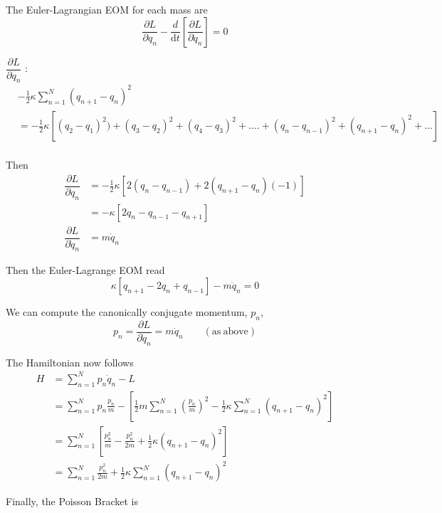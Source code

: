\documentclass{article}
\begin{document}
\noindent The Euler-Lagrangian EOM for each mass are
\begin{equation}
    \dfrac{ \partial L }{ \partial q_n} -  \dfrac{d}{ \mathrm{d} t} \left[\dfrac{ \partial L }{ \partial \dot {q}_n } \right] = 0
\end{equation}

\noindent $\dfrac{ \partial L }{ \partial q_n}$ :
\begin{align*}
    & -\tfrac{1}{2} \kappa \sum_{n=1}^N (q_{n+1} - q_n)^2 \\
    &= -\tfrac{1}{2} \kappa \left[(q_{2} - q_1)^2) + (q_{3} - q_2)^2 + (q_{4} - q_3)^2 +....+ (q_{n} - q_{n-1})^2 + (q_{n+1} - q_n)^2 + \dots \right] \\
\end{align*}

\noindent Then
\begin{align*}
    \dfrac{ \partial L }{ \partial q_n} &= -\tfrac{1}{2} \kappa \left[ 2 (q_{n} - q_{n-1}) + 2 (q_{n+1} - q_n)(-1)  \right] \\
    &= - \kappa \left[2 q_{n} - q_{n-1} - q_{n+1}  \right] \\
    \dfrac{ \partial L }{ \partial \dot q_n} &= m\dot{q}_n
\end{align*}


\noindent Then the Euler-Lagrange EOM read
\begin{equation*}
    \kappa \left[ q_{n+1} -2 q_{n} + q_{n-1} \right] - m \ddot{q}_n = 0
\end{equation*}

\noindent We can compute the canonically conjugate momentum, $p_n$,
\begin{equation*}
  p_n =  \dfrac{ \partial L }{ \partial \dot q_n}  = m \dot{q}_n \qquad \mathrm{(as ~ above)} 
\end{equation*}

\noindent The Hamiltonian now follows
\begin{align*}
    H &= \sum_{n=1}^N p_n \dot{q}_n - L \\
    &= \sum_{n=1}^N p_n \frac{p_n}{m} - \left[\frac{1}{2} m \sum_{n=1}^N {\left( \frac{p_n}{m} \right)}^2 - \tfrac{1}{2} \kappa \sum_{n=1}^N (q_{n+1} - q_n)^2 \right] \\
    &= \sum_{n=1}^N \left[ \frac{p_n^2}{m} - \frac{p_n^2}{2 m} + \tfrac{1}{2} \kappa (q_{n+1} - q_n)^2 \right] \\
    &= \sum_{n=1}^N \frac{p_n^2}{2 m} + \tfrac{1}{2} \kappa \sum_{n=1}^N (q_{n+1} - q_n)^2
\end{align*}


\noindent Finally, the Poisson Bracket is
\end{document}
